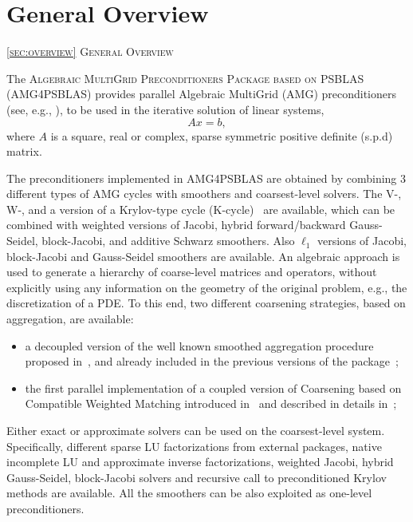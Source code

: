 \section{General Overview\label{sec:overview}}
         {\textsc{\ref{sec:overview} General Overview}}

The \textsc{Algebraic MultiGrid Preconditioners Package based on
PSBLAS (AMG4PSBLAS)} provides parallel Algebraic MultiGrid (AMG) preconditioners (see, e.g., \cite{Briggs2000,Stuben_01}),
to be used in the iterative solution of  linear systems,
\begin{equation}
Ax=b,
\label{system1}
\end{equation}
where $A$ is a square, real or complex, sparse symmetric positive definite (s.p.d) matrix.
%
%

The preconditioners implemented in AMG4PSBLAS are obtained by combining
3 different types of AMG cycles with smoothers and coarsest-level solvers. The V-, W-, and a version of a Krylov-type cycle (K-cycle)~\cite{Briggs2000,Notay2008} are available, which can be combined with weighted versions of Jacobi, hybrid
forward/backward Gauss-Seidel, block-Jacobi, and additive Schwarz smoothers. Also $\ell_1$ versions of Jacobi, block-Jacobi and Gauss-Seidel smoothers are available.
An algebraic approach is used to generate a hierarchy of
coarse-level matrices and operators, without explicitly using any information on the
geometry of the original problem, e.g., the discretization of a PDE. To this end,
two different coarsening strategies, based on aggregation, are available:
\begin{itemize}
\item a decoupled version of the well known smoothed aggregation procedure proposed in~\cite{BREZINA_VANEK,VANEK_MANDEL_BREZINA}, and already included in the previous versions of the package~\cite{BDDF2007,MLD2P4_TOMS};
\item the first parallel implementation of a coupled version of Coarsening based on Compatible Weighted Matching introduced in~\cite{DV2013,DFV2018} and described in details in~\cite{DDF2020};
\end{itemize}

Either exact or approximate solvers can be used on the coarsest-level system. Specifically, different sparse LU factorizations from external
packages, native incomplete LU and approximate inverse factorizations, weighted Jacobi, hybrid Gauss-Seidel, block-Jacobi solvers and recursive call to preconditioned Krylov methods are available. All the smoothers can be also exploited as one-level
preconditioners.

